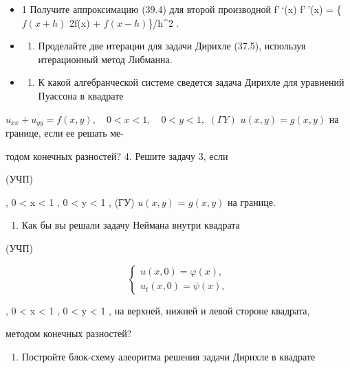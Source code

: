 \documentclass[
  ukrainian,
]{article}
\providecommand{\tightlist}{%
  \setlength{\itemsep}{0pt}\setlength{\parskip}{0pt}}
\begin{document}
\begin{itemize}
\item
  1 Получите аппроксимацию (39.4) для второй производной f'\,`(x)
  f'\,'(x) = \{\(f(x+h)\) 2f(x) + \(f(x-h)\)\}/h\^{}2 .
\item
  \begin{enumerate}
  \def\labelenumi{\arabic{enumi}.}
  \setcounter{enumi}{1}
  \tightlist
  \item
    Проделайте две итерации для задачи Дирихле (37.5), используя
    итерационный метод Либманна.
  \end{enumerate}
\item
  \begin{enumerate}
  \def\labelenumi{\arabic{enumi}.}
  \setcounter{enumi}{2}
  \tightlist
  \item
    К какой алгебранческой системе сведется задача Дирихле для уравнений
    Пуассона в квадрате
  \end{enumerate}
\end{itemize}

\(u_{xx} + u_{yy} = f(x,y), \quad 0 < x < 1, \quad 0 < y < 1,\)
\((\Gamma Y)\) \(u(x,y) = g(x,y)\) на границе, если ее решать ме-

тодом конечных разностей? 4. Решите задачу 3, если

(УЧП)

, 0 \textless{} x \textless{} 1 , 0 \textless{} y \textless{} 1 , (ГУ)
\(u(x, y)\) = \(g(x, y)\) на границе.

\begin{enumerate}
\def\labelenumi{\arabic{enumi}.}
\setcounter{enumi}{4}
\tightlist
\item
  Как бы вы решали задачу Неймана внутри квадрата
\end{enumerate}

(УЧП)

\[
\begin{cases} u(x, 0) = \varphi(x), \\ u_t(x, 0) = \psi(x), \end{cases}
\]

, 0 \textless{} x \textless{} 1 , 0 \textless{} y \textless{} 1 , на
верхней, нижней и левой стороне квадрата,

методом конечных разностей?

\begin{enumerate}
\def\labelenumi{\arabic{enumi}.}
\setcounter{enumi}{5}
\tightlist
\item
  Постройте блок-схему алеоритма решения задачи Дирихле в квадрате
\end{enumerate}
\end{document}
